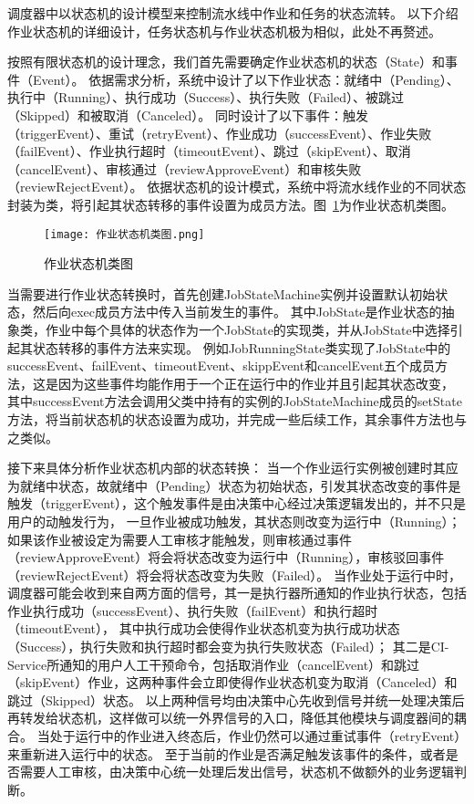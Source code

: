 调度器中以状态机的设计模型来控制流水线中作业和任务的状态流转。
以下介绍作业状态机的详细设计，任务状态机与作业状态机极为相似，此处不再赘述。

按照有限状态机的设计理念，我们首先需要确定作业状态机的状态（State）和事件（Event）。
依据需求分析，系统中设计了以下作业状态：就绪中（Pending）、执行中（Running）、执行成功（Success）、执行失败（Failed）、被跳过（Skipped）和被取消（Canceled）。
同时设计了以下事件：触发（triggerEvent）、重试（retryEvent）、作业成功（successEvent）、作业失败（failEvent）、作业执行超时（timeoutEvent）、跳过（skipEvent）、取消（cancelEvent）、审核通过（reviewApproveEvent）和审核失败（reviewRejectEvent）。
依据状态机的设计模式，系统中将流水线作业的不同状态封装为类，将引起其状态转移的事件设置为成员方法。图~\ref{fig:作业状态机类图}为作业状态机类图。

\begin{figure}[h]
  \centering
  \texttt{[image: 作业状态机类图.png]}
  \caption{作业状态机类图}
  \label{fig:作业状态机类图}
\end{figure}

当需要进行作业状态转换时，首先创建JobStateMachine实例并设置默认初始状态，然后向exec成员方法中传入当前发生的事件。
其中JobState是作业状态的抽象类，作业中每个具体的状态作为一个JobState的实现类，并从JobState中选择引起其状态转移的事件方法来实现。
例如JobRunningState类实现了JobState中的successEvent、failEvent、timeoutEvent、skippEvent和cancelEvent五个成员方法，这是因为这些事件均能作用于一个正在运行中的作业并且引起其状态改变，
其中successEvent方法会调用父类中持有的实例的JobStateMachine成员的setState方法，将当前状态机的状态设置为成功，并完成一些后续工作，其余事件方法也与之类似。

接下来具体分析作业状态机内部的状态转换：
当一个作业运行实例被创建时其应为就绪中状态，故就绪中（Pending）状态为初始状态，引发其状态改变的事件是触发（triggerEvent），这个触发事件是由决策中心经过决策逻辑发出的，并不只是用户的动触发行为，
一旦作业被成功触发，其状态则改变为运行中（Running）；如果该作业被设定为需要人工审核才能触发，则审核通过事件（reviewApproveEvent）将会将状态改变为运行中（Running），审核驳回事件（reviewRejectEvent）将会将状态改变为失败（Failed）。
当作业处于运行中时，调度器可能会收到来自两方面的信号，其一是执行器所通知的作业执行状态，包括作业执行成功（successEvent）、执行失败（failEvent）和执行超时（timeoutEvent），
其中执行成功会使得作业状态机变为执行成功状态（Success），执行失败和执行超时都会变为执行失败状态（Failed）；
其二是CI-Service所通知的用户人工干预命令，包括取消作业（cancelEvent）和跳过（skipEvent）作业，这两种事件会立即使得作业状态机变为取消（Canceled）和跳过（Skipped）状态。
以上两种信号均由决策中心先收到信号并统一处理决策后再转发给状态机，这样做可以统一外界信号的入口，降低其他模块与调度器间的耦合。
当处于运行中的作业进入终态后，作业仍然可以通过重试事件（retryEvent）来重新进入运行中的状态。
至于当前的作业是否满足触发该事件的条件，或者是否需要人工审核，由决策中心统一处理后发出信号，状态机不做额外的业务逻辑判断。

